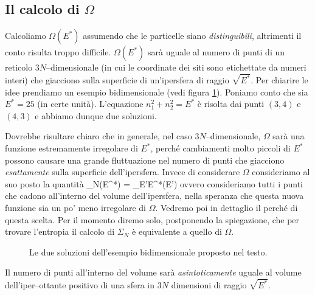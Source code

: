 \subsection{Il calcolo di $\Omega$}

Calcoliamo $\Omega(E^{*})$ assumendo che le particelle siano {\em distinguibili}, altrimenti il conto risulta troppo difficile. $\Omega(E^{*})$ sarà uguale al numero di punti di un reticolo $3N$--dimensionale (in cui le coordinate dei siti sono etichettate da numeri interi) che giacciono sulla superficie di un'ipersfera di raggio $\sqrt{E^{*}}$. Per chiarire le idee prendiamo un esempio bidimensionale (vedi figura \ref{fig:02-e25}). Poniamo conto che sia $E^{*} = 25$ (in certe unità). L'equazione $n^{2}_{1} + n^{2}_{2} = E^{*}$ è risolta dai punti $(3,4)$ e $(4,3)$ e abbiamo dunque due soluzioni.

Dovrebbe risultare chiaro che in generale, nel caso $3N$--dimensionale, $\Omega$ sarà una funzione estremamente irregolare di $E^{*}$, perché cambiamenti molto piccoli di $E^{*}$ possono causare una grande fluttuazione nel numero di punti che giacciono {\em esattamente} sulla superficie dell'ipersfera. Invece di considerare $\Omega$ consideriamo al suo posto la quantità
\be
\label{eq:02-sigma}
\Sigma_{N}(E^{*}) = \sum_{E'\le E^{*}}\Omega(E')
\ee
ovvero consideriamo tutti i punti che cadono all'interno del volume dell'ipersfera, nella speranza che questa nuova funzione sia un po' meno irregolare di $\Omega$. Vedremo poi in dettaglio il perché di questa scelta. Per il momento diremo solo, postponendo la spiegazione, che per trovare l'entropia il calcolo di $\Sigma_{N}$ è equivalente a quello di $\Omega$.

\begin{figure}[!ht]
  \centering
  
  \caption{Le due soluzioni dell'esempio bidimensionale proposto nel testo.}
  \label{fig:02-e25}
\end{figure}

Il numero di punti all'interno del volume sarà {\em asintoticamente} uguale al volume dell'iper--ottante positivo di una sfera in $3N$ dimensioni di raggio $\sqrt{E^{*}}$.

